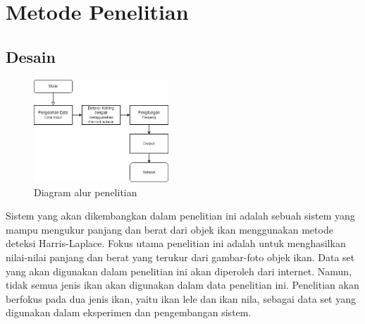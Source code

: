 
\chapter{Metode Penelitian}

\section{Desain }

\begin{figure}
  \centering{}
  \includegraphics[width=0.45\textwidth]{gambar/Flowchart Penelitian.png}
  \caption{Diagram alur penelitian}
\end{figure}

Sistem yang akan dikembangkan dalam penelitian ini adalah sebuah sistem yang mampu mengukur panjang dan berat dari objek ikan menggunakan metode deteksi Harris-Laplace. 
Fokus utama penelitian ini adalah untuk menghasilkan nilai-nilai panjang dan berat yang terukur dari gambar-foto objek ikan. 
Data set yang akan digunakan dalam penelitian ini akan diperoleh dari internet.
Namun, tidak semua jenis ikan akan digunakan dalam data penelitian ini. 
Penelitian akan berfokus pada dua jenis ikan, yaitu ikan lele dan ikan nila, sebagai data set yang digunakan dalam eksperimen dan pengembangan sistem.


